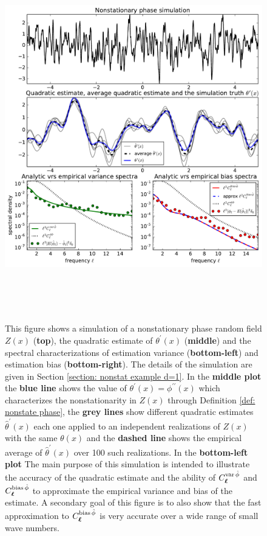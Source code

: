 \documentclass[10pt,noinfoline]{imsart}
\newcommand{\bs}{\boldsymbol}
\begin{document}
\begin{figure}
\includegraphics[height=16cm]{figure2.pdf}%
\caption{ This figure shows a simulation of a nonstationary phase random field $Z(x)$ (\textbf{top}), the quadratic estimate of  $\theta^\prime(x)$ (\textbf{middle}) and the spectral characterizations of estimation variance (\textbf{bottom-left}) and estimation bias (\textbf{bottom-right}). The details of the simulation are given in Section \ref{section: nonstat example d=1}. In the \textbf{middle plot} the \textbf{blue line} shows the value of $\theta^\prime(x)=\phi^{\prime\prime}(x)$ which characterizes the nonstationarity in $Z(x)$ through Definition \ref{def: nonstate phase}, the  \textbf{grey lines} show different quadratic estimates $\hat\theta^\prime(x)$ each one applied to an independent realizations of $Z(x)$ with the same $\theta(x)$ and the \textbf{dashed line} shows the empirical average of $\hat\theta^\prime(x)$ over 100 such realizations. In the \textbf{bottom-left plot}
The main purpose of this simulation is intended to illustrate the accuracy of the quadratic estimate and the ability of $C^{\text{var\,}\hat\phi}_{\bs \ell}$ and $C^{\text{bias\,}\hat\phi}_{\bs \ell}$ to approximate the empirical variance and bias of the estimate. A secondary goal of this figure is to also show that the fast approximation to $C^{\text{bias\,}\hat\phi}_{\bs \ell}$ is very accurate over a wide range of small wave numbers.}
\label{Figure 2 zx and var}
\end{figure}
\end{document}
